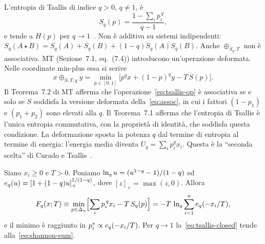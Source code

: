 L'entropia di Tsallis di indice $q>0$, $q\ne1$, è
\begin{equation}
S_q(p)=\frac{1-\sum_ip_i^{\,q}}{q-1},
\label{eq:tsallis}
\end{equation}
e tende a $H(p)$ per $q\to1$~\citep{tsallis1988possible}.
Non è additiva su sistemi indipendenti: $S_q(A\star B)=S_q(A)+S_q(B)+(1-q)S_q(A)S_q(B)$.
Anche $\oplus_{S_q,T}$ non è associativa.
MT (Sezione~7.1, eq.~(7.4)) introducono un'operazione deformata.
Nelle coordinate min-plus essa si scrive
\begin{equation}
x\oplus_{S,T,q}y=\min_{p\in[0,1]}\bigl[p^{q}x+(1-p)^{q}y-T\,S(p)\bigr].
\label{eq:tsallis-op}
\end{equation}
Il Teorema~7.2 di MT afferma che l'operazione~\eqref{eq:tsallis-op} è associativa se e solo se $S$ soddisfa la versione deformata della~\eqref{eq:assoc}, in cui i fattori $(1-p_1)$ e $(p_1+p_2)$ sono elevati alla $q$.
Il Teorema~7.1 afferma che l'entropia di Tsallis è l'unica entropia commutativa, con la proprietà di identità, che soddisfa questa condizione.
La deformazione sposta la potenza $q$ dal termine di entropia al termine di energia: l'energia media diventa $U_q=\sum_ip_i^{q}x_i$.
Questa è la ``seconda scelta'' di Curado e Tsallis~\citep{curado1991generalized}.

\begin{proposizione}
\label{prop:tsallis}
Siano $x_i\ge0$ e $T>0$.
Poniamo $\ln_q u=(u^{1-q}-1)/(1-q)$ ed $e_q(u)=[1+(1-q)u]_+^{1/(1-q)}$, dove $[z]_+=\max(z,0)$.
Allora
\begin{equation}
F_q(x;T)\equiv\min_{p\in\Delta_n}\Bigl[\sum_ip_i^{\,q}x_i-T\,S_q(p)\Bigr]=-T\,\ln_q\sum_{i=1}^ne_q(-x_i/T),
\label{eq:tsallis-closed}
\end{equation}
e il minimo è raggiunto in $p_i^*\propto e_q(-x_i/T)$.
Per $q\to1$ la~\eqref{eq:tsallis-closed} tende alla~\eqref{eq:shannon-sum}.
\end{proposizione}

